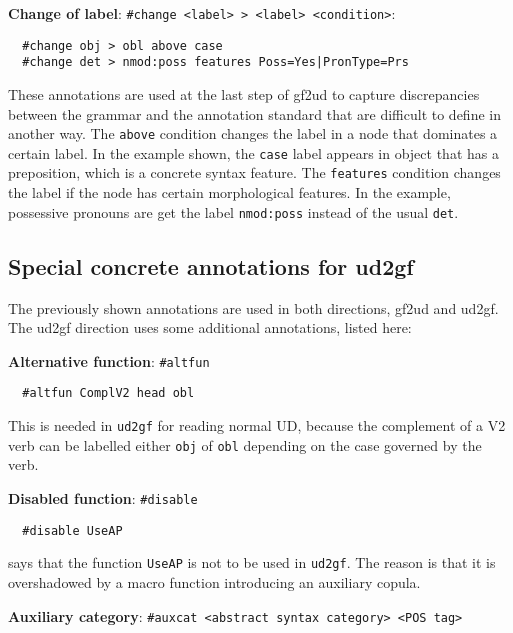 \textbf{Change of label}:
\texttt{\#change\ \textless{}label\textgreater{}\ \textgreater{}\ \textless{}label\textgreater{}\ \textless{}condition\textgreater{}}:

\begin{verbatim}
  #change obj > obl above case
  #change det > nmod:poss features Poss=Yes|PronType=Prs
\end{verbatim}

These annotations are used at the last step of gf2ud to capture
discrepancies between the grammar and the annotation standard that are
difficult to define in another way. The \texttt{above} condition changes
the label in a node that dominates a certain label. In the example
shown, the \texttt{case} label appears in object that has a preposition,
which is a concrete syntax feature. The \texttt{features} condition
changes the label if the node has certain morphological features. In the
example, possessive pronouns are get the label \texttt{nmod:poss}
instead of the usual \texttt{det}.

\hypertarget{special-concrete-annotations-for-ud2gf}{%
\subsection{Special concrete annotations for
ud2gf}\label{special-concrete-annotations-for-ud2gf}}

The previously shown annotations are used in both directions, gf2ud and
ud2gf. The ud2gf direction uses some additional annotations, listed
here:

\textbf{Alternative function}: \texttt{\#altfun}

\begin{verbatim}
  #altfun ComplV2 head obl
\end{verbatim}

This is needed in \texttt{ud2gf} for reading normal UD, because the
complement of a V2 verb can be labelled either \texttt{obj} of
\texttt{obl} depending on the case governed by the verb.

\textbf{Disabled function}: \texttt{\#disable}

\begin{verbatim}
  #disable UseAP
\end{verbatim}

says that the function \texttt{UseAP} is not to be used in
\texttt{ud2gf}. The reason is that it is overshadowed by a macro
function introducing an auxiliary copula.

\textbf{Auxiliary category}: \verb|#auxcat <abstract syntax category> <POS tag>|

